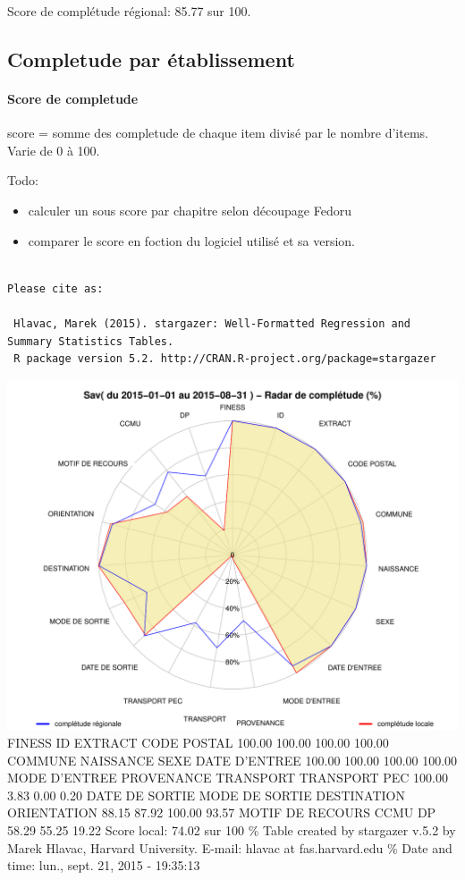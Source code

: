 \documentclass[]{article}
\begin{document}
Score de complétude régional: 85.77 sur 100.

\subsection{Completude par
établissement}\label{completude-par-etablissement}

\paragraph{Score de completude}\label{score-de-completude}

score = somme des completude de chaque item divisé par le nombre
d'items. Varie de 0 à 100.

Todo:

\begin{itemize}
\itemsep1pt\parskip0pt
\item
  calculer un sous score par chapitre selon découpage Fedoru
\item
  comparer le score en foction du logiciel utilisé et sa version.
\end{itemize}

\begin{verbatim}

Please cite as: 

 Hlavac, Marek (2015). stargazer: Well-Formatted Regression and Summary Statistics Tables.
 R package version 5.2. http://CRAN.R-project.org/package=stargazer 
\end{verbatim}

\includegraphics{completude_files/figure-latex/finess-1.pdf} FINESS ID
EXTRACT CODE POSTAL 100.00 100.00 100.00 100.00 COMMUNE NAISSANCE SEXE
DATE D'ENTREE 100.00 100.00 100.00 100.00 MODE D'ENTREE PROVENANCE
TRANSPORT TRANSPORT PEC 100.00 3.83 0.00 0.20 DATE DE SORTIE MODE DE
SORTIE DESTINATION ORIENTATION 88.15 87.92 100.00 93.57 MOTIF DE RECOURS
CCMU DP 58.29 55.25 19.22 Score local: 74.02 sur 100 \% Table created by
stargazer v.5.2 by Marek Hlavac, Harvard University. E-mail: hlavac at
fas.harvard.edu \% Date and time: lun., sept. 21, 2015 - 19:35:13
\end{document}
